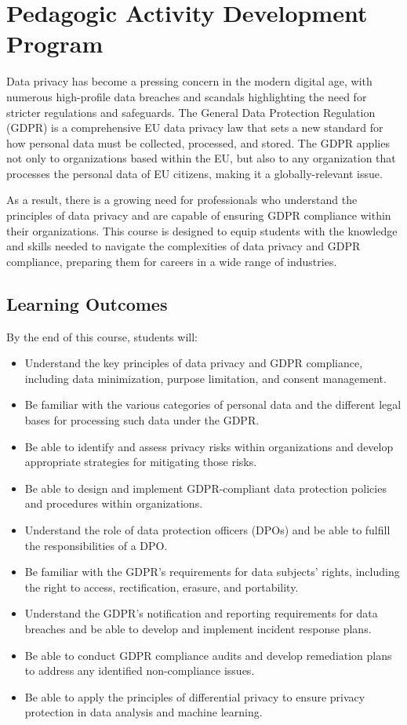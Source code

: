 \documentclass[11pt]{article}
\begin{document}
\section{Pedagogic Activity Development Program}

Data privacy has become a pressing concern in the modern digital age, with numerous high-profile data breaches and scandals highlighting the need for stricter regulations and safeguards. The General Data Protection Regulation (GDPR) is a comprehensive EU data privacy law that sets a new standard for how personal data must be collected, processed, and stored. The GDPR applies not only to organizations based within the EU, but also to any organization that processes the personal data of EU citizens, making it a globally-relevant issue.

As a result, there is a growing need for professionals who understand the principles of data privacy and are capable of ensuring GDPR compliance within their organizations. This course is designed to equip students with the knowledge and skills needed to navigate the complexities of data privacy and GDPR compliance, preparing them for careers in a wide range of industries.

\subsection{Learning Outcomes}

By the end of this course, students will:

    \begin{itemize}
        \item Understand the key principles of data privacy and GDPR compliance, including data minimization, purpose limitation, and consent management.
        \item  Be familiar with the various categories of personal data and the different legal bases for processing such data under the GDPR.
        \item     Be able to identify and assess privacy risks within organizations and develop appropriate strategies for mitigating those risks.
        \item     Be able to design and implement GDPR-compliant data protection policies and procedures within organizations.
        \item     Understand the role of data protection officers (DPOs) and be able to fulfill the responsibilities of a DPO.
        \item    Be familiar with the GDPR's requirements for data subjects' rights, including the right to access, rectification, erasure, and portability.
        \item     Understand the GDPR's notification and reporting requirements for data breaches and be able to develop and implement incident response plans.
        \item     Be able to conduct GDPR compliance audits and develop remediation plans to address any identified non-compliance issues.
        \item 
    Be able to apply the principles of differential privacy to ensure privacy protection in data analysis and machine learning.
    \end{itemize}
\end{document}
